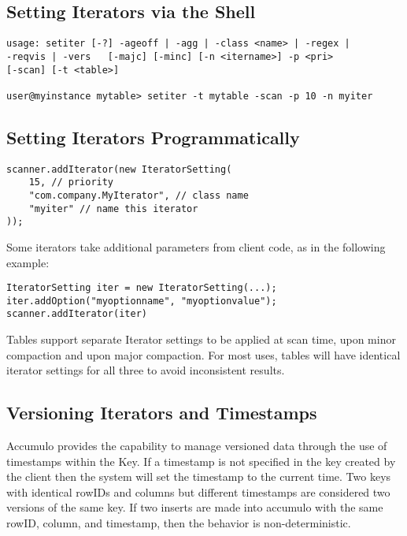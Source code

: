 \subsection{Setting Iterators via the Shell}

\small
\begin{verbatim}
usage: setiter [-?] -ageoff | -agg | -class <name> | -regex | 
-reqvis | -vers   [-majc] [-minc] [-n <itername>] -p <pri>   
[-scan] [-t <table>]

user@myinstance mytable> setiter -t mytable -scan -p 10 -n myiter
\end{verbatim}
\normalsize

\subsection{Setting Iterators Programmatically}

\small
\begin{verbatim}
scanner.addIterator(new IteratorSetting(
    15, // priority
    "com.company.MyIterator", // class name
    "myiter" // name this iterator
));
\end{verbatim}
\normalsize

Some iterators take additional parameters from client code, as in the following
example:

\small
\begin{verbatim}
IteratorSetting iter = new IteratorSetting(...);
iter.addOption("myoptionname", "myoptionvalue");
scanner.addIterator(iter)
\end{verbatim}
\normalsize

Tables support separate Iterator settings to be applied at scan time, upon minor
compaction and upon major compaction. For most uses, tables will have identical
iterator settings for all three to avoid inconsistent results.

\subsection{Versioning Iterators and Timestamps}

Accumulo provides the capability to manage versioned data through the use of
timestamps within the Key. If a timestamp is not specified in the key created by the
client then the system will set the timestamp to the current time. Two keys with
identical rowIDs and columns but different timestamps are considered two versions
of the same key. If two inserts are made into accumulo with the same rowID,
column, and timestamp, then the behavior is non-deterministic.

